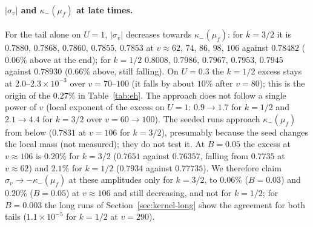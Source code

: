 \documentclass[11pt]{article}
\begin{document}
\paragraph{$|\sigma_v|$ and $\kappa_-(\mu_f)$ at late times.} For the tail alone on $U=1$, $|\sigma_v|$ decreases towards $\kappa_-(\mu_f)$: for $k=3/2$ it is $0.7880,\,0.7868,\,0.7860,\,0.7855,\,0.7853$ at $v\approx62,\,74,\,86,\,98,\,106$ against $0.78482$ ($0.06\%$ above at the end); for $k=1/2$ $0.8008,\,0.7986,\,0.7967,\,0.7953,\,0.7945$ against $0.78930$ ($0.66\%$ above, still falling). On $U=0.3$ the $k=1/2$ excess stays at $2.0$--$2.3\times10^{-3}$ over $v=70$--$100$ (it falls by about $10\%$ after $v=80$); this is the origin of the $0.27\%$ in Table~\ref{tab:eh}. The approach does not follow a single power of $v$ (local exponent of the excess on $U=1$: $0.9\to1.7$ for $k=1/2$ and $2.1\to4.4$ for $k=3/2$ over $v=60\to100$). The seeded runs approach $\kappa_-(\mu_f)$ from below ($0.7831$ at $v=106$ for $k=3/2$), presumably because the seed changes the local mass (not measured); they do not test it. At $B=0.05$ the excess at $v\approx106$ is $0.20\%$ for $k=3/2$ ($0.7651$ against $0.76357$, falling from $0.7735$ at $v\approx62$) and $2.1\%$ for $k=1/2$ ($0.7934$ against $0.77735$). We therefore claim $\sigma_v\to-\kappa_-(\mu_f)$ at these amplitudes only for $k=3/2$, to $0.06\%$ ($B=0.03$) and $0.20\%$ ($B=0.05$) at $v\approx106$ and still decreasing, and not for $k=1/2$; for $B=0.003$ the long runs of Section~\ref{sec:kernel-long} show the agreement for both tails ($1.1\times10^{-5}$ for $k=1/2$ at $v=290$).
\end{document}

